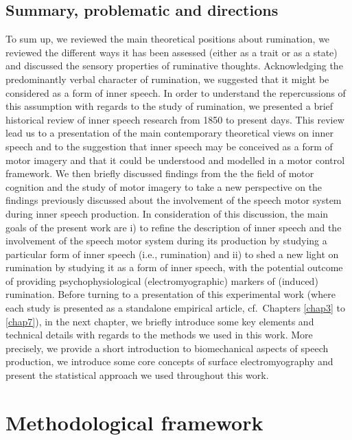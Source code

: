 \documentclass[a4paper,12pt,twoside,openright,oldfontcommands]{memoir}
\begin{document}
\hypertarget{summary-problematic-and-directions}{%
\section{Summary, problematic and directions}\label{summary-problematic-and-directions}}

To sum up, we reviewed the main theoretical positions about rumination, we reviewed the different ways it has been assessed (either as a trait or as a state) and discussed the sensory properties of ruminative thoughts. Acknowledging the predominantly verbal character of rumination, we suggested that it might be considered as a form of inner speech. In order to understand the repercussions of this assumption with regards to the study of rumination, we presented a brief historical review of inner speech research from 1850 to present days. This review lead us to a presentation of the main contemporary theoretical views on inner speech and to the suggestion that inner speech may be conceived as a form of motor imagery and that it could be understood and modelled in a motor control framework. We then briefly discussed findings from the the field of motor cognition and the study of motor imagery to take a new perspective on the findings previously discussed about the involvement of the speech motor system during inner speech production. In consideration of this discussion, the main goals of the present work are i) to refine the description of inner speech and the involvement of the speech motor system during its production by studying a particular form of inner speech (i.e., rumination) and ii) to shed a new light on rumination by studying it as a form of inner speech, with the potential outcome of providing psychophysiological (electromyographic) markers of (induced) rumination. Before turning to a presentation of this experimental work (where each study is presented as a standalone empirical article, cf.~Chapters \ref{chap3} to \ref{chap7}), in the next chapter, we briefly introduce some key elements and technical details with regards to the methods we used in this work. More precisely, we provide a short introduction to biomechanical aspects of speech production, we introduce some core concepts of surface electromyography and present the statistical approach we used throughout this work.

\hypertarget{chap2}{%
\chapter{Methodological framework}\label{chap2}}
\end{document}

